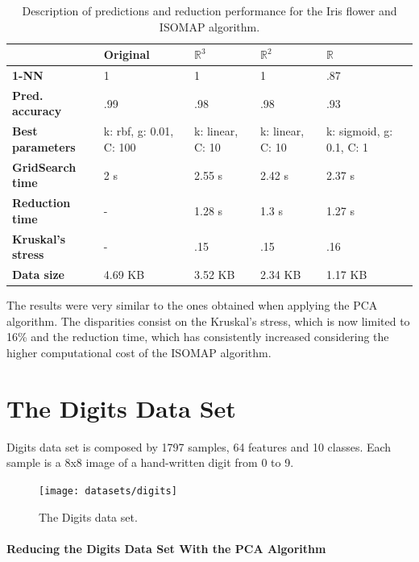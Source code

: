\begin{table}[H]
	\centering
	
	\begin{tabular}{|p{.25\linewidth}|p{.15\linewidth}|p{.15\linewidth}|p{.15\linewidth}|p{.15\linewidth}|}
		\hline
		& \textbf{Original} & $\mathbb{R}^3$ & $\mathbb{R}^2$ & $\mathbb{R}$ \\\hline
		\textbf{1-NN} & 1 & 1 & 1 & .87 \\\hline
		\textbf{Pred. accuracy} & .99 & .98 & .98 & .93 \\\hline
		\textbf{Best parameters} & k: rbf, g: 0.01, C: 100 & k: linear, C: 10 & k: linear, C: 10 & k: sigmoid, g: 0.1, C: 1 \\\hline
		\textbf{GridSearch time} & 2 s & 2.55 s & 2.42 s & 2.37 s \\\hline
		\textbf{Reduction time} & - & 1.28 s & 1.3 s & 1.27 s \\\hline
		\textbf{Kruskal's stress} & - & .15 & .15 & .16 \\\hline
		\textbf{Data size} & 4.69 KB & 3.52 KB & 2.34 KB & 1.17 KB \\\hline
	\end{tabular}
	\captionsetup{justification=centering}
	\caption{Description of predictions and reduction performance for the Iris flower and ISOMAP algorithm.}
\end{table}

The results were very similar to the ones obtained when applying the PCA algorithm. The disparities consist on the Kruskal's stress, which is now limited to 16\% and the reduction time, which has consistently increased considering the higher computational cost of the ISOMAP algorithm.

\clearpage
\section{The Digits Data Set}

Digits data set is composed by 1797 samples, 64 features and 10 classes. Each sample is a 8x8 image of a hand-written digit from 0 to 9.

\begin{figure}[H]
	\centering
	\captionsetup{justification=centering}
	\texttt{[image: datasets/digits]}
	\caption{The Digits data set.}
\end{figure}

\newpage
\paragraph{Reducing the Digits Data Set With the PCA Algorithm}

